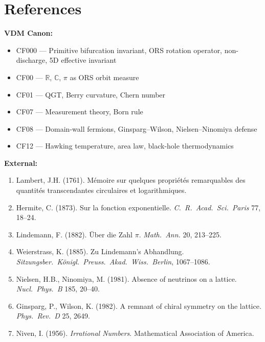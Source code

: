 \documentclass[11pt]{article}
\theoremstyle{definition}
\theoremstyle{remark}
\begin{document}
\section*{References}

\textbf{VDM Canon:}
\begin{itemize}
\item CF000 --- Primitive bifurcation invariant, ORS rotation operator,
  non-discharge, 5D effective invariant
\item CF00 --- $\mathbb{R}$, $\mathbb{C}$, $\pi$ as ORS orbit measure
\item CF01 --- QGT, Berry curvature, Chern number
\item CF07 --- Measurement theory, Born rule
\item CF08 --- Domain-wall fermions, Ginsparg--Wilson, Nielsen--Ninomiya
  defense
\item CF12 --- Hawking temperature, area law, black-hole thermodynamics
\end{itemize}

\textbf{External:}
\begin{enumerate}
\item Lambert, J.H. (1761). M\'{e}moire sur quelques propri\'{e}t\'{e}s
  remarquables des quantit\'{e}s transcendantes circulaires et logarithmiques.
\item Hermite, C. (1873). Sur la fonction exponentielle.
  \textit{C.~R.~Acad.~Sci.~Paris} 77, 18--24.
\item Lindemann, F. (1882). \"{U}ber die Zahl $\pi$.
  \textit{Math.~Ann.} 20, 213--225.
\item Weierstrass, K. (1885). Zu Lindemann's Abhandlung.
  \textit{Sitzungsber.~K\"{o}nigl.~Preuss.~Akad.~Wiss.~Berlin},
  1067--1086.
\item Nielsen, H.B., Ninomiya, M. (1981). Absence of neutrinos on a
  lattice. \textit{Nucl.~Phys.~B} 185, 20--40.
\item Ginsparg, P., Wilson, K. (1982). A remnant of chiral symmetry on
  the lattice. \textit{Phys.~Rev.~D} 25, 2649.
\item Niven, I. (1956). \textit{Irrational Numbers}. Mathematical
  Association of America.
\end{enumerate}
\end{document}
